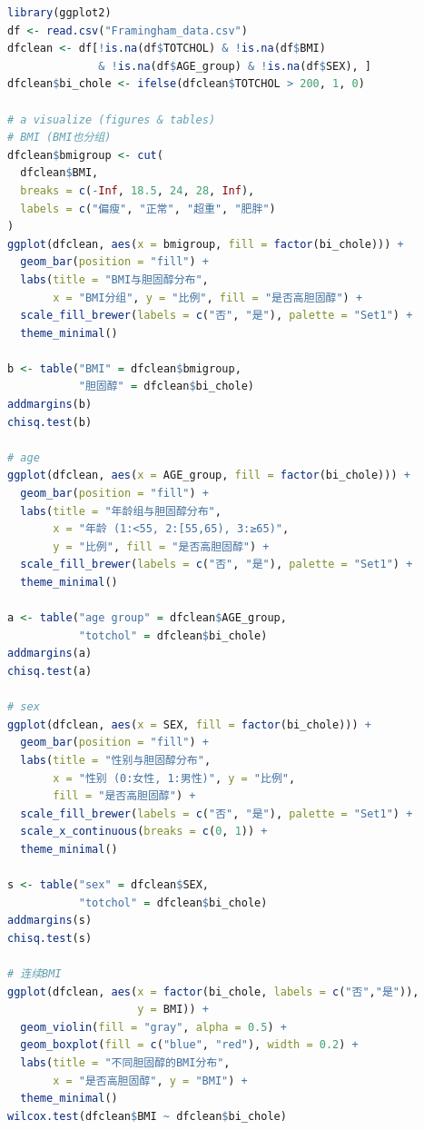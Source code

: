 \begin{lstlisting}[language=R]
library(ggplot2)
df <- read.csv("Framingham_data.csv")
dfclean <- df[!is.na(df$TOTCHOL) & !is.na(df$BMI)
              & !is.na(df$AGE_group) & !is.na(df$SEX), ]
dfclean$bi_chole <- ifelse(dfclean$TOTCHOL > 200, 1, 0)

# a visualize (figures & tables)
# BMI (BMI也分组)
dfclean$bmigroup <- cut(
  dfclean$BMI,
  breaks = c(-Inf, 18.5, 24, 28, Inf),
  labels = c("偏瘦", "正常", "超重", "肥胖")
)
ggplot(dfclean, aes(x = bmigroup, fill = factor(bi_chole))) +
  geom_bar(position = "fill") +
  labs(title = "BMI与胆固醇分布",
       x = "BMI分组", y = "比例", fill = "是否高胆固醇") +
  scale_fill_brewer(labels = c("否", "是"), palette = "Set1") +
  theme_minimal()

b <- table("BMI" = dfclean$bmigroup,
           "胆固醇" = dfclean$bi_chole)
addmargins(b)
chisq.test(b)

# age
ggplot(dfclean, aes(x = AGE_group, fill = factor(bi_chole))) +
  geom_bar(position = "fill") +
  labs(title = "年龄组与胆固醇分布",
       x = "年龄 (1:<55, 2:[55,65), 3:≥65)",
       y = "比例", fill = "是否高胆固醇") +
  scale_fill_brewer(labels = c("否", "是"), palette = "Set1") +
  theme_minimal()

a <- table("age group" = dfclean$AGE_group,
           "totchol" = dfclean$bi_chole)
addmargins(a)
chisq.test(a)

# sex
ggplot(dfclean, aes(x = SEX, fill = factor(bi_chole))) +
  geom_bar(position = "fill") +
  labs(title = "性别与胆固醇分布",
       x = "性别 (0:女性, 1:男性)", y = "比例",
       fill = "是否高胆固醇") +
  scale_fill_brewer(labels = c("否", "是"), palette = "Set1") +
  scale_x_continuous(breaks = c(0, 1)) +
  theme_minimal()

s <- table("sex" = dfclean$SEX,
           "totchol" = dfclean$bi_chole)
addmargins(s)
chisq.test(s)

# 连续BMI
ggplot(dfclean, aes(x = factor(bi_chole, labels = c("否","是")),
                    y = BMI)) +
  geom_violin(fill = "gray", alpha = 0.5) +
  geom_boxplot(fill = c("blue", "red"), width = 0.2) +
  labs(title = "不同胆固醇的BMI分布",
       x = "是否高胆固醇", y = "BMI") +
  theme_minimal()
wilcox.test(dfclean$BMI ~ dfclean$bi_chole)
\end{lstlisting}
